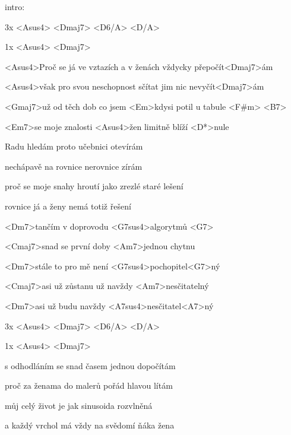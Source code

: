 

intro:

3x        <Asus4>             <Dmaj7>           <D6/A> <D/A>

1x        <Asus4> <Dmaj7>

\zs
<Asus4>Proč se já ve vztazích a v ženách vždycky přepočít<Dmaj7>ám

<Asus4>však pro svou neschopnost sčítat jim nic nevyčít<Dmaj7>ám

<Gmaj7>už od těch dob co jsem <Em>kdysi potil u tabule <F#m> <B7>

<Em7>se moje znalosti <Asus4>žen limitně blíží <D*>nule
\ks

\zs
Radu hledám proto učebnici otevírám

nechápavě na rovnice nerovnice zírám

proč se moje snahy hroutí jako zrezlé staré lešení

rovnice já a ženy nemá totiž řešení
\ks

\zr
<Dm7>tančím v doprovodu <G7sus4>algorytmů <G7>

<Cmaj7>snad se první doby <Am7>jednou chytnu

<Dm7>stále to pro mě není <G7sus4>pochopitel<G7>ný

<Cmaj7>asi už zůstanu už navždy <Am7>nesčitatelný

<Dm7>asi už budu navždy <A7sus4>nesčitatel<A7>ný
\kr

3x        <Asus4>             <Dmaj7>           <D6/A> <D/A>

1x        <Asus4> <Dmaj7>
 
\zs
s odhodláním se snad časem jednou dopočítám

proč za ženama do malerů pořád hlavou lítám

můj celý život je jak sinusoida rozvlněná

a každý vrchol má vždy na svědomí ňáka žena
\ks

\kp
